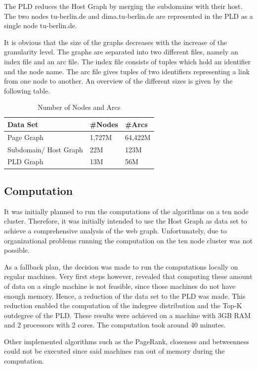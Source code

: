 The PLD reduces the Host Graph by merging the subdomains with their host. The two nodes tu-berlin.de and dima.tu-berlin.de are represented in the PLD as a single node tu-berlin.de.

It is obvious that the size of the graphs decreases with the increase of the granularity level. The graphs are separated into two different files, namely an index file and an arc file. The index file consists of tuples which hold an identifier and the node name. The arc file gives tuples of two identifiers representing a link from one node to another. An overview of the different sizes is given by the following table.

\begin{table}[H]
	\caption{Number of Nodes and Arcs}
	\label{t2}
	\begin{center}
		\begin{tabular}{|l|l|l|}
			\hline
			Data Set	&\#Nodes	&\#Arcs \\ \hline
			Page Graph	&1,727M	&64,422M	\\	\hline
			Subdomain/ Host Graph	&22M	&123M	\\	\hline		
			PLD Graph	&13M	&56M	\\	\hline				
		\end{tabular}
	\end{center}
\end{table}

\subsection{Computation}
It was initially planned to run the computations of the algorithms on a ten node cluster. Therefore, it was initially intended to use the Host Graph as data set to achieve a comprehensive  analysis of the web graph. Unfortunately, due to organizational problems running the computation on the ten node cluster was not possible.

As a fallback plan, the decision was made to run the computations locally on regular machines. Very first steps however, revealed that computing these amount of data on a single machine is not feasible, since those machines do not have enough memory. Hence, a reduction of the data set to the PLD was made. This reduction enabled the computation of the indegree distribution and the Top-K outdegree of the PLD. These results were achieved on a machine with 3GB RAM and 2 processors with 2 cores. The computation took around 40 minutes. 

Other implemented algorithms such as the PageRank, closeness and betweenness could not be executed since said machines ran out of memory during the computation.

